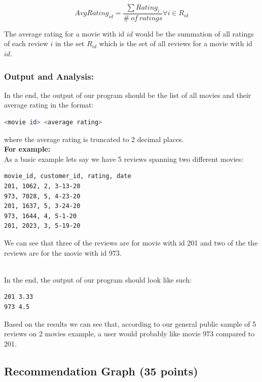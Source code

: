 \documentclass{article}
\begin{document}
\vspace{0.1cm}
$$AvgRating_{id} = \frac{\sum Rating_i}{\#\ of\ ratings} \forall i \in R_{id}$$
\vspace{0.1cm}

\noindent The average rating for a movie with id $id$ would be the summation of all ratings of each review $i$ in the set $R_{id}$ which is the set of all reviews for a movie with id $id$.

\subsubsection*{Output and Analysis:}
In the end, the output of our program should be the list of all movies and their average rating in the format:
\begin{lstlisting}[language=bash]
                        <movie id> <average rating> 
\end{lstlisting}
\vspace{0.1cm}
where the average rating is truncated to 2 decimal places.\\

\noindent \textbf{For example:}\\
As a basic example lets say we have 5 reviews spanning two different movies: 
\begin{Verbatim}[frame=single]
movie_id, customer_id, rating, date
201, 1062, 2, 3-13-20
973, 7028, 5, 4-23-20
201, 1637, 5, 3-24-20
973, 1644, 4, 5-1-20
201, 2023, 3, 5-19-20
\end{Verbatim}
We can see that three of the reviews are for movie with id 201 and two of the the reviews are for the movie with id 973.

\-\ \\In the end, the output of our program should look like such:
\begin{Verbatim}[frame=single]
201 3.33
973 4.5
\end{Verbatim}
Based on the results we can see that, according to our general public sample of 5 reviews on 2 movies example, a user would probably like movie 973 compared to 201. 

\newpage
\subsection{Recommendation Graph (35 points)}
\end{document}
